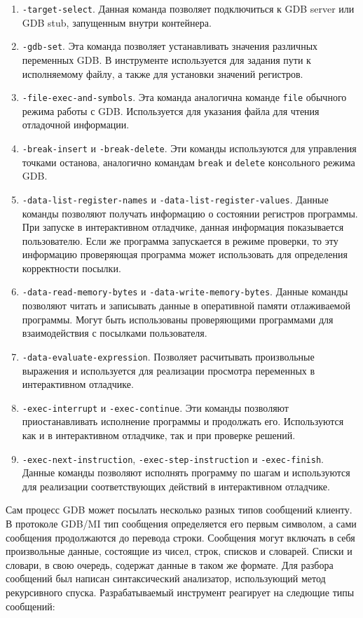 \documentclass[a4paper,article,14pt]{extarticle}
\begin{document}
\begin{enumerate}
    \item \texttt{-target-select}. Данная команда позволяет подключиться к GDB server или GDB stub, запущенным внутри контейнера.
    \item \texttt{-gdb-set}. Эта команда позволяет устанавливать значения различных переменных GDB. В инструменте используется для задания пути к исполняемому файлу, а также для установки значений регистров.
    \item \texttt{-file-exec-and-symbols}. Эта команда аналогична команде \texttt{file} обычного режима работы с GDB. Используется для указания файла для  чтения отладочной информации.
    \item \texttt{-break-insert} и \texttt{-break-delete}. Эти команды используются для управления точками останова, аналогично командам \texttt{break} и \texttt{delete} консольного режима GDB.
    \item \texttt{-data-list-register-names} и \texttt{-data-list-register-values}. Данные команды позволяют получать информацию о состоянии регистров программы. При запуске в интерактивном отладчике, данная информация показывается пользователю. Если же программа запускается в режиме проверки, то эту информацию проверяющая программа может использовать для определения корректности посылки.
    \item \texttt{-data-read-memory-bytes} и \texttt{-data-write-memory-bytes}. Данные команды позволяют читать и записывать данные в оперативной памяти отлаживаемой программы. Могут быть использованы проверяющими программами для взаимодействия с посылками пользователя.
    \item \texttt{-data-evaluate-expression}. Позволяет расчитывать произвольные выражения и используется для реализации просмотра переменных в интерактивном отладчике.
    \item \texttt{-exec-interrupt} и \texttt{-exec-continue}. Эти команды позволяют приостанавливать исполнение программы и продолжать его. Используются как и в интерактивном отладчике, так и при проверке решений.
    \item \texttt{-exec-next-instruction}, \texttt{-exec-step-instruction} и \texttt{-exec-finish}. Данные команды позволяют исполнять программу по шагам и используются для реализации соответствующих действий в интерактивном отладчике.
\end{enumerate}

Сам процесс GDB может посылать несколько разных типов сообщений клиенту. В протоколе GDB/MI тип сообщения определяется его первым символом, а сами сообщения продолжаются до перевода строки. Сообщения могут включать в себя произвольные данные, состоящие из чисел, строк, списков и словарей. Списки и словари, в свою очередь, содержат данные в таком же формате. Для разбора сообщений был написан синтаксический анализатор, использующий метод рекурсивного спуска\cite{parsing}. Разрабатываемый инструмент реагирует на следющие типы сообщений:
\end{document}
